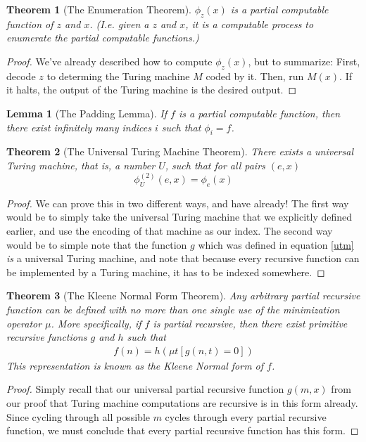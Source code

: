 \documentclass{article}
\theoremstyle{definition}
\theoremstyle{plain}
\theoremstyle{theorem}
\newtheorem{lemma}{Lemma}[section]
\newtheorem{theorem}{Theorem}[section]
\begin{document}
\begin{theorem}[The Enumeration Theorem]
    $\phi_z(x)$ is a partial computable function of $z$ and $x$. (I.e. given a $z$ and $x$, it is a computable process to enumerate the partial computable functions.)
\end{theorem}
\begin{proof}
    We've already described how to compute $\phi_z(x)$, but to summarize: First, decode $z$ to determing the Turing machine $M$ coded by it. Then, run $M(x)$. If it halts, the output of the Turing machine is the desired output.
\end{proof}
\begin{lemma}[The Padding Lemma]
    If $f$ is a partial computable function, then there exist infinitely many indices $i$ such that $\phi_i = f$.
\end{lemma}
\begin{theorem}[The Universal Turing Machine Theorem]
    There exists a universal Turing machine, that is, a number $U$, such that for all pairs $(e,x)$
    \[ \phi_U^{(2)}(e,x) = \phi_e(x) \] 
\end{theorem}
\begin{proof}
    We can prove this in two different ways, and have already! The first way would be to simply take the universal Turing machine that we explicitly defined earlier, and use the encoding of that machine as our index. The second way would be to simple note that the function $g$ which was defined in equation \ref{utm} \textit{is} a universal Turing machine, and note that because every recursive function can be implemented by a Turing machine, it has to be indexed somewhere.
\end{proof}
\begin{theorem}[The Kleene Normal Form Theorem]
    Any arbitrary partial recursive function can be defined with no more than one single use of the minimization operator $\mu$. More specifically, if $f$ is partial recursive, then there exist primitive recursive functions $g$ and $h$ such that
    \begin{align}
        f(n) = h(\mu t [g(n,t) = 0])
    \end{align}
    This representation is known as the Kleene Normal form of $f$. 
\end{theorem}
\begin{proof}
    Simply recall that our universal partial recursive function $g(m,x)$ from our proof that Turing machine computations are recursive is in this form already. Since cycling through all possible $m$ cycles through every partial recursive function, we must conclude that every partial recursive function has this form.
\end{proof}
\end{document}
